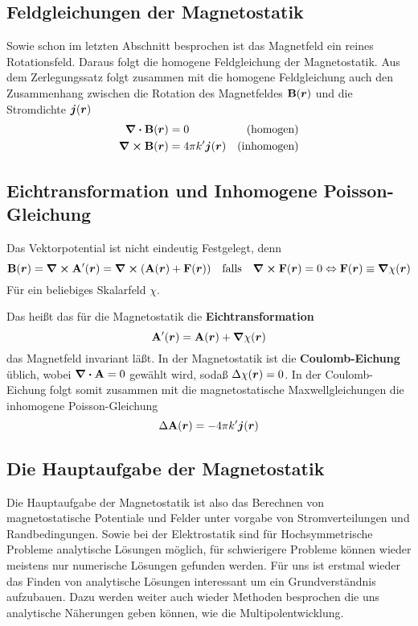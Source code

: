 \subsection{Feldgleichungen der Magnetostatik}%
\label{sub:feldgleichungen-magnetostatik}
Sowie schon im letzten Abschnitt besprochen ist das Magnetfeld ein reines
Rotationsfeld. Daraus folgt die homogene Feldgleichung der Magnetostatik.
Aus dem Zerlegungssatz folgt zusammen mit die homogene Feldgleichung auch
den Zusammenhang zwischen die Rotation des Magnetfeldes $\vb B(\vb*r)$ und die Stromdichte $\vb*j(\vb*r)$
\begin{equation}
  \begin{aligned}
    \div \vb B(\vb*r) &= 0 & \text{(homogen)}\\
    \curl \vb B(\vb*r) &= 4\pi k'\vb*j(\vb*r) & \text{(inhomogen)}\\
  \end{aligned}
\end{equation}

\subsection{Eichtransformation und Inhomogene Poisson-Gleichung}%
\label{sub:eichtransformation}
Das Vektorpotential ist nicht eindeutig Festgelegt, denn
\begin{equation}
  \vb B(\vb*r) = \curl \vb A'(\vb*r)= \curl (\vb A(\vb*r) + \vb F(\vb*r)) 
  \quad\text{falls}\quad\curl \vb F(\vb*r)=0
  \Leftrightarrow \vb F(\vb*r) \equiv \grad \chi(\vb*r)
\end{equation}
Für ein beliebiges Skalarfeld $\chi$.

Das heißt das für die Magnetostatik die \textbf{Eichtransformation}
\begin{equation}
  \vb A'(\vb*r) = \vb A(\vb*r) + \grad \chi(\vb*r)
\end{equation}
das Magnetfeld invariant läßt. In der Magnetostatik ist die \textbf{Coulomb-Eichung} üblich, wobei $\div \vb A=0$ gewählt wird, sodaß $\Delta \chi(\vb*r)=0$. In der Coulomb-Eichung folgt somit zusammen mit die magnetostatische Maxwellgleichungen die inhomogene Poisson-Gleichung
\begin{equation}
  \Delta \vb A(\vb*r) = -4\pi k' \vb*j(\vb*r)
\end{equation}

\subsection{Die Hauptaufgabe der Magnetostatik} 
Die Hauptaufgabe der Magnetostatik ist also das Berechnen von 
magnetostatische Potentiale und Felder unter vorgabe von 
Stromverteilungen und Randbedingungen. 
Sowie bei der Elektrostatik sind für Hochsymmetrische Probleme analytische 
Lösungen möglich, für schwierigere Probleme können wieder meistens nur numerische 
Lösungen gefunden werden. Für uns ist erstmal wieder das Finden von analytische
Lösungen interessant um ein Grundverständnis aufzubauen. Dazu werden weiter auch wieder Methoden besprochen die uns analytische Näherungen geben können, wie die Multipolentwicklung.
